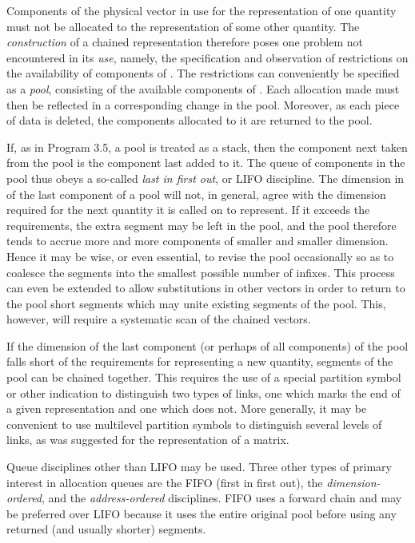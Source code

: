 {\par Components of the physical vector \textbf{\pi} in use for the representation of one quantity must not be allocated to the representation of some other quantity. The \textit{construction} of a chained representation therefore poses one problem not encountered in its \textit{use}, namely, the specification and observation of restrictions on the availability of components of \textbf{\pi}. The restrictions can conveniently be specified as a \textit{pool}, consisting of the available components of \textbf{\pi}. Each allocation made must then be reflected in a corresponding change in the pool. Moreover, as each piece of data is deleted, the components allocated to it are returned to the pool.

\par If, as in Program 3.5, a pool is treated as a stack, then the component next taken from the pool is the component last added to it. The queue of components in the pool thus obeys a so-called \textit{last in first out}, or LIFO discipline. The dimension in \textbf{\pi} of the last component of a pool will not, in general, agree with the dimension required for the next quantity it is called on to represent. If it exceeds the requirements, the extra segment may be left in the pool, and the pool therefore tends to accrue more and more components of smaller and smaller dimension. Hence it may be wise, or even essential, to revise the pool occasionally so as to coalesce the segments into the smallest possible number of infixes. This process can even be extended to allow substitutions in other vectors in order to return to the pool short segments which may unite existing segments of the pool. This, however, will require a systematic scan of the chained vectors.

\par If the dimension of the last component (or perhaps of all components) of the pool falls short of the requirements for representing a new quantity, segments of the pool can be chained together. This requires the use of a special partition symbol or other indication to distinguish two types of links, one which marks the end of a given representation and one which does not. More generally, it may be convenient to use multilevel partition symbols to distinguish several levels of links, as was suggested for the representation of a matrix.

\par Queue disciplines other than LIFO may be used. Three other types of primary interest in allocation queues are the FIFO (first in first out), the \textit{dimension-ordered}, and the \textit{address-ordered} disciplines. FIFO uses a forward chain and may be preferred over LIFO because it uses the entire original pool before using any returned (and usually shorter) segments.

}
